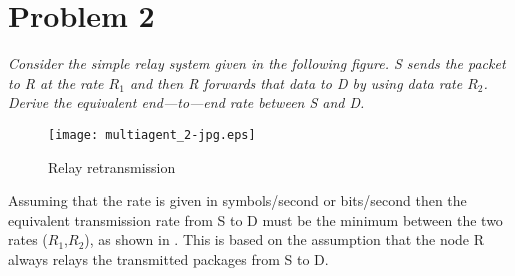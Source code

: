 \section{Problem 2} \label{sec:mm5_Pb2}
\textit{ Consider the simple relay system given in the following figure. S sends the packet 
to R at the rate $R_1$ and then R forwards that data to D by using data rate $R_2$. Derive the 
equivalent end—to—end rate between S and D. }

\begin{figure}[!h]
  \centering
  \texttt{[image: multiagent\_2-jpg.eps]}
  \caption{Relay retransmission}
  \label{fig:multiagent_2-jpg}
\end{figure}

Assuming that the rate is given in symbols/second or bits/second then the equivalent transmission rate from S to D must be the minimum between the two rates ($R_1$,$R_2$), as shown in . This is based on the assumption that the node R always relays the transmitted packages from S to D.